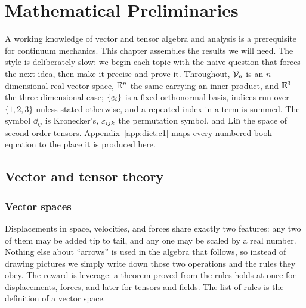 



\chapter{Mathematical Preliminaries}

A working knowledge of vector and tensor algebra and analysis is a
prerequisite for continuum mechanics. This chapter assembles the results
we will need. The style is deliberately slow: we begin each topic with the
naive question that forces the next idea, then make it precise and prove
it. Throughout, $\mathcal{V}_{n}$ is an $n$ dimensional real vector space, $\mathbb{E}^{n}$ the
same carrying an inner product, and $\mathbb{E}^{3}$ the three dimensional case;
$\{\be_i\}$ is a fixed orthonormal basis, indices run over $\{1,2,3\}$
unless stated otherwise, and a repeated index in a term is summed. The
symbol $\dd_{ij}$ is Kronecker's, $\varepsilon_{ijk}$ the permutation symbol, and
$\operatorname{Lin}$ the space of second order tensors. Appendix~\ref{app:dict:c1} maps
every numbered book equation to the place it is produced here.

\section{Vector and tensor theory}\label{sec:vtt}

\subsection{Vector spaces}\label{ss:vs}

Displacements in space, velocities, and forces share exactly two features:
any two of them may be added tip to tail, and any one may be scaled by a
real number. Nothing else about ``arrows'' is used in the algebra that
follows, so instead of drawing pictures we simply write down those two
operations and the rules they obey. The reward is leverage: a theorem
proved from the rules holds at once for displacements, forces, and later
for tensors and fields. The list of rules is the definition of a vector
space.


